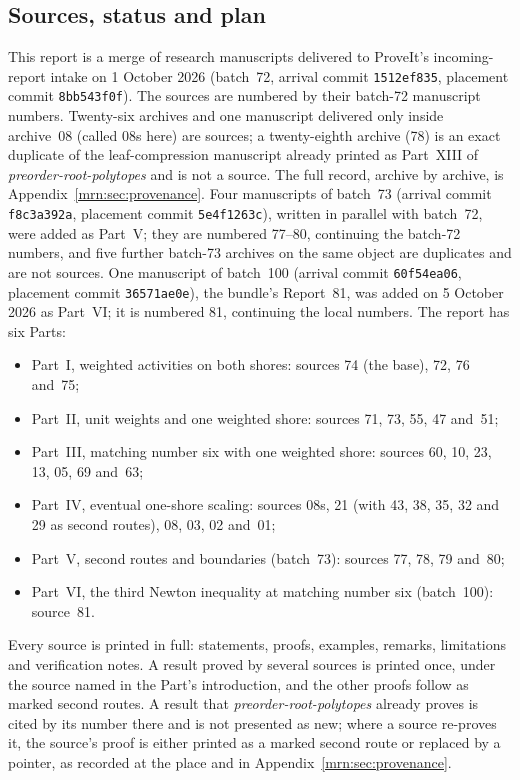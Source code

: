 \documentclass[11pt,a4paper]{article}
\theoremstyle{remark}\newtheorem{remark}[theorem]{Remark}
\newcommand{\prp}{\emph{preorder-root-polytopes}}
\begin{document}
\subsection{Sources, status and plan}\label{mrn:sec:scope}
This report is a merge of research manuscripts delivered to ProveIt's
incoming-report intake on 1 October 2026 (batch~72, arrival commit
\texttt{1512ef835}, placement commit \texttt{8bb543f0f}). The sources are
numbered by their batch-72 manuscript numbers. Twenty-six archives and one
manuscript delivered only inside archive~08 (called 08s here) are sources;
a twenty-eighth archive (78) is an exact duplicate of the leaf-compression
manuscript already printed as Part~XIII of \prp{} and is not a source.
The full record, archive by archive, is Appendix~\ref{mrn:sec:provenance}.
Four manuscripts of batch~73 (arrival commit \texttt{f8c3a392a}, placement
commit \texttt{5e4f1263c}), written in parallel with batch~72, were added as
Part~V; they are numbered 77--80, continuing the batch-72 numbers, and five
further batch-73 archives on the same object are duplicates and are not
sources.
One manuscript of batch~100 (arrival commit \texttt{60f54ea06}, placement
commit \texttt{36571ae0e}), the bundle's Report~81, was added on
5 October 2026 as Part~VI; it is numbered 81, continuing the local numbers.
The report has six Parts:
\begin{itemize}
\item Part~I, weighted activities on both shores: sources 74 (the base), 72,
  76 and~75;
\item Part~II, unit weights and one weighted shore: sources 71, 73, 55, 47
  and~51;
\item Part~III, matching number six with one weighted shore: sources 60, 10,
  23, 13, 05, 69 and~63;
\item Part~IV, eventual one-shore scaling: sources 08s, 21 (with 43, 38, 35,
  32 and 29 as second routes), 08, 03, 02 and~01;
\item Part~V, second routes and boundaries (batch~73): sources 77, 78, 79
  and~80;
\item Part~VI, the third Newton inequality at matching number six
  (batch~100): source~81.
\end{itemize}

Every source is printed in full: statements, proofs, examples, remarks,
limitations and verification notes. A result proved by several sources is
printed once, under the source named in the Part's introduction, and the
other proofs follow as marked second routes. A result that \prp{} already
proves is cited by its number there and is not presented as new; where a
source re-proves it, the source's proof is either printed as a marked second
route or replaced by a pointer, as recorded at the place and in
Appendix~\ref{mrn:sec:provenance}.
\end{document}
